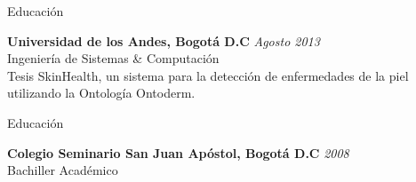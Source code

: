 \documentclass[spanish]{resume} %
\begin{document}

\begin{rSection}{Educaci\'on}

{\bf Universidad de los Andes, Bogot\'a D.C} \hfill {\em Agosto 2013} \\ 
Ingenier\'ia de Sistemas \& Computaci\'on \\
Tesis SkinHealth, un sistema para la detecci\'on de enfermedades de la piel utilizando la Ontolog\'ia Ontoderm.

\end{rSection}

\begin{rSection}{Educaci\'on}

{\bf Colegio Seminario San Juan Ap\'ostol, Bogot\'a D.C} \hfill {\em 2008} \\ 
Bachiller Acad\'emico

\end{rSection}

\end{document}

